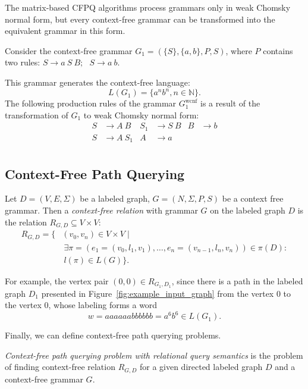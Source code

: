 The matrix-based CFPQ algorithms process grammars only in weak Chomsky normal form, but every context-free grammar can be transformed into the equivalent grammar in this form.

Consider the context-free grammar $G_1=(\{S\},\{a, b\}, P, S)$, where $P$ contains two rules:
$S \rightarrow a \ S \ B; \ \ \ 
S \rightarrow a \ b
$.

This grammar generates the context-free language: $$L(G_1) = \{a^nb^n, n \in \mathbb{N}\}.$$
The following production rules of the grammar $G_1^{\text{wcnf}}$ is a result of the transformation of $G_1$ to weak Chomsky normal form:
\begin{align*}
S& \to A \ B   & S_1& \to S \ B   & B& \to b  \\
S& \to A \ S_1 & A& \to a &&  \\
\end{align*}


\subsection{Context-Free Path Querying}

\begin{definition}
Let $D = (V, E, \Sigma)$ be a labeled graph, $G = (N, \Sigma, P, S)$ be a context free grammar. Then a \emph{context-free relation} with grammar $G$ on the labeled graph $D$ is the relation $R_{G, D} \subseteq V \times V$:
\begin{equation*} \label{eq1}
\begin{split}
R_{G, D} = \{ &(v_0, v_n) \in V \times V  \mid \\ &\ \exists \pi = (e_1 = (v_0, l_1, v_1), \ldots, e_n = (v_{n-1}, l_n, v_n)) \in \pi(D): \\
      &\ l(\pi) \in L(G) \}.
\end{split}
\end{equation*}
\end{definition}

For example, the vertex pair $(0,0) \in R_{G_1, D_1}$, since there is a path in the labeled graph $D_1$ presented in Figure~\ref{fig:example_input_graph} from the vertex $0$ to the vertex $0$, whose labeling forms a word $$w = aaaaaabbbbbb = a^6b^6 \in L(G_1).$$

Finally, we can define context-free path querying problems.
\begin{definition}
    \emph{Context-free path querying problem with relational query semantics} is the problem of finding context-free relation $R_{G, D}$ for a given directed labeled graph $D$ and a context-free grammar $G$.
\end{definition}

